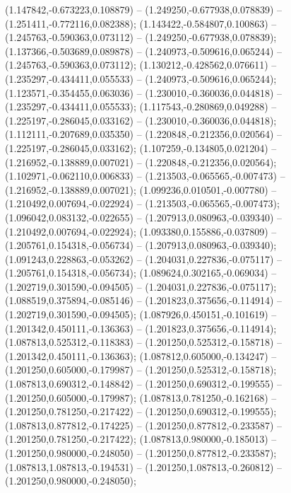  (1.147842,-0.673223,0.108879) -- (1.249250,-0.677938,0.078839) -- (1.251411,-0.772116,0.082388);
 (1.143422,-0.584807,0.100863) -- (1.245763,-0.590363,0.073112) -- (1.249250,-0.677938,0.078839);
 (1.137366,-0.503689,0.089878) -- (1.240973,-0.509616,0.065244) -- (1.245763,-0.590363,0.073112);
 (1.130212,-0.428562,0.076611) -- (1.235297,-0.434411,0.055533) -- (1.240973,-0.509616,0.065244);
 (1.123571,-0.354455,0.063036) -- (1.230010,-0.360036,0.044818) -- (1.235297,-0.434411,0.055533);
 (1.117543,-0.280869,0.049288) -- (1.225197,-0.286045,0.033162) -- (1.230010,-0.360036,0.044818);
 (1.112111,-0.207689,0.035350) -- (1.220848,-0.212356,0.020564) -- (1.225197,-0.286045,0.033162);
 (1.107259,-0.134805,0.021204) -- (1.216952,-0.138889,0.007021) -- (1.220848,-0.212356,0.020564);
 (1.102971,-0.062110,0.006833) -- (1.213503,-0.065565,-0.007473) -- (1.216952,-0.138889,0.007021);
 (1.099236,0.010501,-0.007780) -- (1.210492,0.007694,-0.022924) -- (1.213503,-0.065565,-0.007473);
 (1.096042,0.083132,-0.022655) -- (1.207913,0.080963,-0.039340) -- (1.210492,0.007694,-0.022924);
 (1.093380,0.155886,-0.037809) -- (1.205761,0.154318,-0.056734) -- (1.207913,0.080963,-0.039340);
 (1.091243,0.228863,-0.053262) -- (1.204031,0.227836,-0.075117) -- (1.205761,0.154318,-0.056734);
 (1.089624,0.302165,-0.069034) -- (1.202719,0.301590,-0.094505) -- (1.204031,0.227836,-0.075117);
 (1.088519,0.375894,-0.085146) -- (1.201823,0.375656,-0.114914) -- (1.202719,0.301590,-0.094505);
 (1.087926,0.450151,-0.101619) -- (1.201342,0.450111,-0.136363) -- (1.201823,0.375656,-0.114914);
 (1.087813,0.525312,-0.118383) -- (1.201250,0.525312,-0.158718) -- (1.201342,0.450111,-0.136363);
 (1.087812,0.605000,-0.134247) -- (1.201250,0.605000,-0.179987) -- (1.201250,0.525312,-0.158718);
 (1.087813,0.690312,-0.148842) -- (1.201250,0.690312,-0.199555) -- (1.201250,0.605000,-0.179987);
 (1.087813,0.781250,-0.162168) -- (1.201250,0.781250,-0.217422) -- (1.201250,0.690312,-0.199555);
 (1.087813,0.877812,-0.174225) -- (1.201250,0.877812,-0.233587) -- (1.201250,0.781250,-0.217422);
 (1.087813,0.980000,-0.185013) -- (1.201250,0.980000,-0.248050) -- (1.201250,0.877812,-0.233587);
 (1.087813,1.087813,-0.194531) -- (1.201250,1.087813,-0.260812) -- (1.201250,0.980000,-0.248050);

